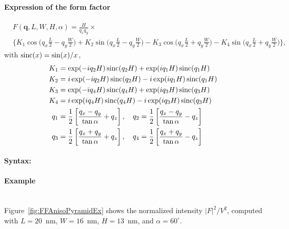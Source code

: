 \paragraph{Expression of the form factor}
\begin{align*}
&F(\mathbf{q}, L, W, H, \alpha)=
\frac{H}{q_xq_y} \times \\
&\Big\{
K_1\cos\Big(q_x \frac{L}{2} -q_y \frac{W}{2}\Big)+  K_2 \sin \Big (q_x
\frac{L}{2}- q_y \frac{W}{2}\Big) - K_3 \cos \Big (q_x \frac{L}{2} +q_y \frac{W}{2}\Big)-
K_4 \sin \Big (q_x \frac{L}{2} + q_y \frac{W}{2}\Big)
\Big\},
\end{align*}
with $\operatorname{sinc}(x)=\sin(x)/x$,
\begin{align*}
K_1 &= \exp(-i q_2 H) \operatorname{sinc}(q_2 H) + \exp(iq_1 H) \operatorname{sinc}(q_1 H) \\
K_2 &= i \exp(-iq_2 H) \operatorname{sinc}(q_2 H) -i \exp(iq_1 H) \operatorname{sinc}(q_1 H) \\
K_3 &= \exp(-iq_4 H) \operatorname{sinc}(q_4 H) + \exp(iq_3 H) \operatorname{sinc}(q_3 H) \\
K_4 &= i \exp(i q_4 H) \operatorname{sinc}(q_4 H) -i \exp(iq_3 H) \operatorname{sinc}(q_3 H)\\
q_1 &= \frac{1}{2}\left[\frac{q_x -q_y}{\tan \alpha} +q_z \right],\quad q_2 = \frac{1}{2}\left[\frac{q_x -q_y}{\tan \alpha} -q_z \right]\\
q_3 &= \frac{1}{2}\left[\frac{q_x +q_y}{\tan \alpha} +q_z \right] , \quad q_4 = \frac{1}{2}\left[\frac{q_x +q_y}{\tan \alpha} -q_z \right]
\end{align*}

\paragraph{Syntax:} 

\paragraph{Example}\mbox{}\\
Figure~\ref{fig:FFAnisoPyramidEx} shows the normalized intensity
$|F|^2/V^2$, computed with $L=20$~nm, $W=16$~nm, $H=13$~nm, and
$\alpha=60^{\circ}$.

